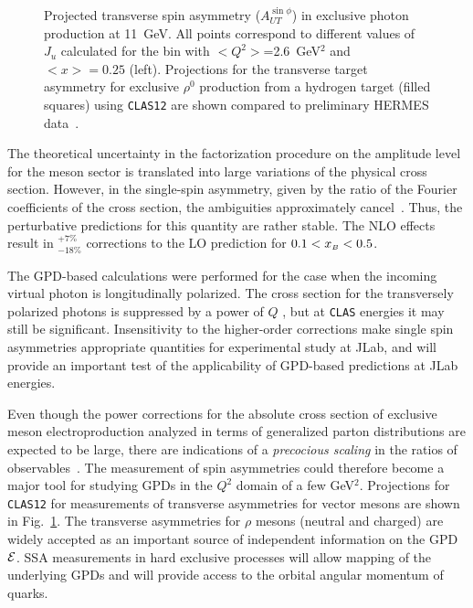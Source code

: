 \begin{figure}[htbp]
\vspace{7.0cm}
\caption{\small Projected transverse spin asymmetry ($A_{UT}^{\sin\phi}$)
in exclusive photon production at 11~GeV.  All points correspond to different 
values of $J_u$ calculated for the bin with $<Q^2>$=2.6~GeV$^2$ and 
$<x>=0.25$ (left). Projections for the transverse target asymmetry for exclusive
$\rho^0$ production from a hydrogen target (filled squares) using {\tt CLAS12} 
are shown compared to preliminary HERMES data~\protect\cite{hermesrho}.}
\label{fig:autdvcs}
\end{figure}

The theoretical uncertainty in the factorization procedure on the amplitude 
level for the meson sector is translated into large variations of the physical 
cross section.  However, in the single-spin asymmetry, given by the ratio
of the Fourier coefficients of the cross section, the ambiguities 
approximately cancel~\cite{Belitsky:2003tm}.  Thus, the perturbative 
predictions for this quantity are rather stable. The NLO effects result in 
${}^{+ 7 \%}_{- 18 \%}$ corrections to the LO prediction for 
$0.1 < x_{\scriptscriptstyle B} < 0.5$.

The GPD-based calculations were performed for the case when the incoming 
virtual photon is longitudinally polarized.  The cross section for the 
transversely polarized photons is suppressed by a power of $Q$
\cite{Collins:1996fb}, but at {\tt CLAS} energies it may still be significant. 
Insensitivity to the higher-order corrections make single spin asymmetries
appropriate quantities for experimental study at JLab, and will provide an 
important test of the applicability of GPD-based predictions at JLab energies.

Even though the power corrections for the absolute cross section of exclusive
meson electroproduction analyzed in terms of generalized parton distributions
are expected to be large, there are indications of a {\it precocious scaling} 
in the ratios of observables~\cite{Belitsky:2003tm}.  The measurement of spin 
asymmetries could therefore become a major tool for studying GPDs in the 
$Q^2$ domain of a few GeV$^2$. Projections for {\tt CLAS12} for measurements 
of transverse asymmetries for vector mesons are shown in 
Fig.~\ref{fig:autdvcs}.  The transverse asymmetries for $\rho$ mesons (neutral 
and charged) are widely accepted as an important source of independent 
information on the GPD $\cal{E}$.  SSA measurements in hard exclusive processes 
will allow mapping of the underlying GPDs and will provide access to the 
orbital angular momentum of quarks.


